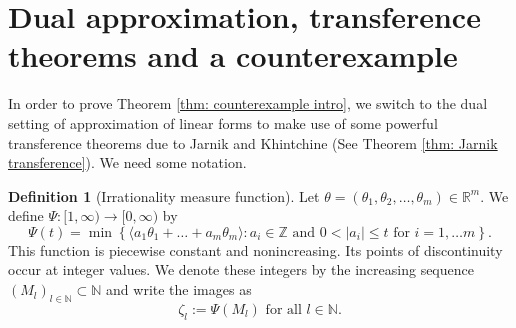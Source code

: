 \documentclass[reqno,11pt, twoside]{amsart}
\theoremstyle{plain}
\theoremstyle{definition}
\newtheorem{defn}[thm]{Definition}
\theoremstyle{definition}
\theoremstyle{remark}
\numberwithin{equation}{section}
\newcommand{\R}{{\mathbb{R}}}
\newcommand{\Z}{{\mathbb{Z}}}
\newcommand{\N}{{\mathbb{N}}}
\begin{document}
\section{Dual approximation, transference theorems and a counterexample}\label{sec: transference}

In order to prove Theorem \ref{thm: counterexample intro}, we switch to the dual setting of approximation of linear forms to make use of some powerful transference theorems due to Jarnik and Khintchine (See Theorem \ref{thm: Jarnik transference}). We need some notation.

\begin{defn}[Irrationality measure function]
    Let $\theta = (\theta_1, \theta_2, \dots ,\theta_m) \in \R^m$. 
    We define $\Psi : [1,\infty) \to  [0,\infty)$ by
    \begin{equation*}
        \Psi(t) = \min\left\lbrace  \langle a_1 \theta_1 + \dots + a_m \theta_m\rangle : a_i \in \Z \text{ and } 0 < |a_i| \leq t \text{ for }  i=1,\dots m \right\rbrace.
    \end{equation*}
    This function is piecewise constant and nonincreasing. Its points of discontinuity occur at integer values. We denote these integers by the increasing sequence $(M_l)_{l \in \N} \subset \N$ and write the images as
    \begin{equation*}
        \zeta_l := \Psi(M_l) \text{ for all } l \in \N.
    \end{equation*}
\end{defn}
\end{document}

